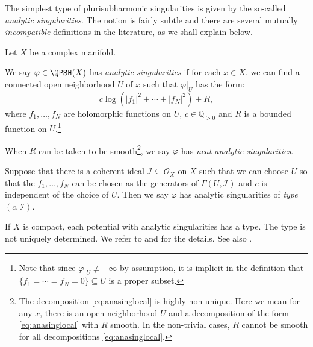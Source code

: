 The simplest type of plurisubharmonic singularities is given by the so-called \emph{analytic singularities}.
The notion is fairly subtle and there are several mutually \emph{incompatible} definitions in the literature, as we shall explain below.

Let $X$ be a complex manifold.
\begin{definition}\label{def:neatanasing}
    We say $\varphi\in \QPSH(X)$ has \emph{analytic singularities}  if for each $x\in X$, we can find a connected open neighborhood $U$ of $x$ such that $\varphi|_U$ has the form:
    \begin{equation}\label{eq:anasinglocal}
    c\log (|f_1|^2+\cdots+|f_N|^2)+R,
    \end{equation}
    where $f_1,\ldots,f_N$ are holomorphic functions on $U$, $c\in \mathbb{Q}_{>0}$ and $R$ is a bounded function on $U$.\footnote{Note that since $\varphi|_U\not\equiv -\infty$ by assumption, it is implicit in the definition that $\{f_1=\cdots=f_N=0\}\subseteq U$ is a proper subset.}


    When $R$ can be taken to be smooth\footnote{The decomposition \eqref{eq:anasinglocal} is highly non-unique. Here we mean for any $x$, there is an open neighborhood $U$ and a decomposition of the form \eqref{eq:anasinglocal} with $R$ smooth. In the non-trivial cases, $R$ cannot be smooth for all decompositions \eqref{eq:anasinglocal}.}, we say $\varphi$ has \emph{neat analytic singularities}.

    Suppose that there is a coherent ideal $\mathcal{I}\subseteq \mathcal{O}_X$ on $X$ such that we can choose $U$ so that the $f_1,\ldots,f_N$ can be chosen as the generators of $\Gamma(U,\mathcal{I})$ and $c$ is independent of the choice of $U$. Then we say $\varphi$ has analytic singularities of \emph{type} $(c,\mathcal{I})$.
\end{definition}
If $X$ is compact, each potential with analytic singularities has a type. The type is not uniquely determined.
We refer to \cite{Bou02} and \cite{Bou02b} for the details. See also \cite[Section~13.1]{FPT}.

